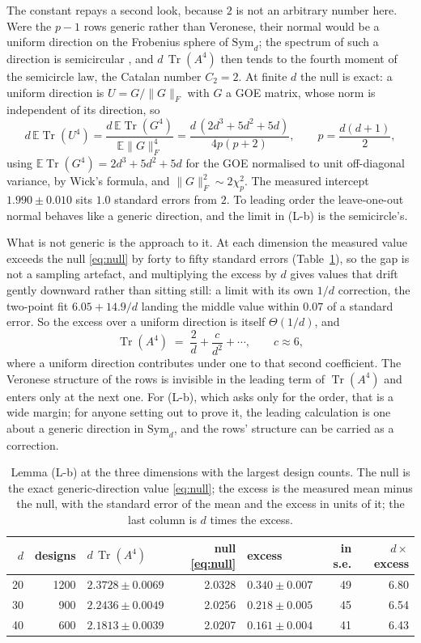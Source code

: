 \documentclass[11pt]{article}
\theoremstyle{definition}
\DeclareMathOperator{\Tr}{Tr}
\newcommand{\E}{\mathbb{E}}
\newcommand{\numLbExcA}{6.05}
\newcommand{\numLbExcB}{14.9}
\newcommand{\numLbExcC}{6}
\newcommand{\numLbExcPull}{0.07}
\newcommand{\numLbFitA}{1.990}
\newcommand{\numLbFitAse}{0.010}
\newcommand{\numLbFitPull}{1.0}
\begin{document}
The constant repays a second look, because $2$ is not an arbitrary number here. Were the $p-1$ rows
generic rather than Veronese, their normal would be a uniform direction on the Frobenius sphere of
$\mathrm{Sym}_d$; the spectrum of such a direction is semicircular \cite{Wigner,AGZ}, and
$d\,\Tr(A^4)$ then tends to the fourth moment of the semicircle law, the Catalan number $C_2=2$. At
finite $d$ the null is exact: a uniform direction is $U=G/\|G\|_F$ with $G$ a GOE matrix, whose
norm is independent of its direction, so
\begin{equation}
d\,\E\Tr(U^4)=\frac{d\,\E\Tr(G^4)}{\E\|G\|_F^4}=\frac{d\,(2d^3+5d^2+5d)}{4p(p+2)},
\qquad p=\frac{d(d+1)}{2},
\label{eq:null}
\end{equation}
using $\E\Tr(G^4)=2d^3+5d^2+5d$ for the GOE normalised to unit off-diagonal variance, by Wick's
formula, and $\|G\|_F^2\sim2\chi^2_p$. The measured intercept $\numLbFitA\pm\numLbFitAse$ sits $\numLbFitPull$
standard errors from $2$. To leading order the leave-one-out normal behaves like a generic direction,
and the limit in (L-b) is the semicircle's.

What is not generic is the approach to it. At each dimension the measured value exceeds the null
\eqref{eq:null} by forty to fifty standard errors (Table~\ref{tab:lb}), so the gap is not a sampling
artefact, and multiplying the excess by $d$ gives values that drift gently downward rather than
sitting still: a limit with its own $1/d$ correction, the two-point fit $\numLbExcA+\numLbExcB/d$
landing the middle value within $\numLbExcPull$ of a standard error. So the excess over a uniform
direction is itself $\Theta(1/d)$, and
\[
\Tr(A^4)\;=\;\frac{2}{d}+\frac{c}{d^2}+\cdots,\qquad c\approx \numLbExcC,
\]
where a uniform direction contributes under one to that second coefficient. The Veronese structure
of the rows is invisible in the leading term of $\Tr(A^4)$ and enters only at the next one. For
(L-b), which asks only for the order, that is a wide margin; for anyone setting out to prove it, the
leading calculation is one about a generic direction in $\mathrm{Sym}_d$, and the rows' structure
can be carried as a correction.

\begin{table}[t]
\centering\small
\caption{Lemma (L-b) at the three dimensions with the largest design counts. The null is the exact
generic-direction value \eqref{eq:null}; the excess is the measured mean minus the null, with the
standard error of the mean and the excess in units of it; the last column is $d$ times the excess.}
\label{tab:lb}
\begin{tabular}{rrlrlrr}
\toprule
$d$ & designs & $d\,\Tr(A^4)$ & null \eqref{eq:null} & excess & in s.e. & $d\times$excess\\
\midrule
20 & 1200 & $2.3728\pm0.0069$ & 2.0328 & $0.340\pm0.007$ & 49 & 6.80\\
30 & 900 & $2.2436\pm0.0049$ & 2.0256 & $0.218\pm0.005$ & 45 & 6.54\\
40 & 600 & $2.1813\pm0.0039$ & 2.0207 & $0.161\pm0.004$ & 41 & 6.43\\
\bottomrule
\end{tabular}
\end{table}
\end{document}

